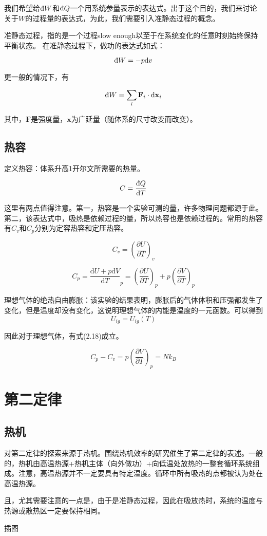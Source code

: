 \documentclass[a4paper, 10pt, openany]{book}%
\begin{document}
我们希望给$\text{\dj}W$和$\text{\dj}Q$一个用系统参量表示的表达式。出于这个目的，我们来讨论关于$W$的过程量的表达式，为此，我们需要引入准静态过程的概念。

准静态过程，指的是一个过程slow enough以至于在系统变化的任意时刻始终保持平衡状态。
在准静态过程下，做功的表达式如式：

\begin{equation}\text{\dj}W=-p\mathrm{d}v\end{equation}

更一般的情况下，有

\begin{equation}\text{\dj}W=\sum_{i}\textbf{F}_i\cdot \mathrm{d}\textbf{x}_i\end{equation}

其中，$\textbf{F}$是强度量，$\textbf{x}$为广延量（随体系的尺寸改变而改变）。


\subsection{热容}

定义热容：体系升高1开尔文所需要的热量。

\begin{equation}C=\frac{\text{\dj}Q}{\mathrm{d}T}\end{equation}

这里有两点值得注意。第一，热容是一个实验可测的量，许多物理问题都源于此。第二，该表达式中，吸热是依赖过程的量，所以热容也是依赖过程的。常用的热容有$C_v$和$C_p$分别为定容热容和定压热容。

\begin{equation}C_v=\left(\frac{\partial U}{\partial T}\right)_v\end{equation}

\begin{equation}C_p=\frac{\mathrm{d}U+p\mathrm{d}V}{\mathrm{d}T}_p=\left(\frac{\partial U}{\partial T}\right)_p+p\left(\frac{\partial V}{\partial T}\right)_p\end{equation}

理想气体的绝热自由膨胀：该实验的结果表明，膨胀后的气体体积和压强都发生了变化，但是温度却没有变化，这说明理想气体的内能是温度的一元函数。可以得到
\begin{equation}U_{ig}=U_{ig}(T)\end{equation}


因此对于理想气体，有式(2.18)成立。

\begin{equation}C_p-C_v=p\left(\frac{\partial V}{\partial T}\right)_p=Nk_B\end{equation}

\section{第二定律}

\subsection{热机 }
对第二定律的探索来源于热机。围绕热机效率的研究催生了第二定律的表述。一般的，热机由高温热源+热机主体（向外做功）+向低温处放热的一整套循环系统组成。注意，高温热源并不一定要具有特定温度。循环中所有吸热的点都被认为处在高温热源。

且，尤其需要注意的一点是，由于是准静态过程，因此在吸放热时，系统的温度与热源或散热区一定要保持相同。

插图
\end{document}
